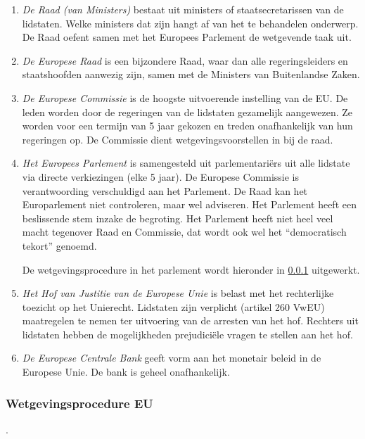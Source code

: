 \documentclass{article}
\begin{document}
\begin{enumerate}

  \item \emph{De Raad (van Ministers)} bestaat uit ministers of
    staatsecretarissen van de lidstaten. Welke ministers dat zijn hangt af van
    het te behandelen onderwerp. De Raad oefent samen met het Europees
    Parlement de wetgevende taak uit.

  \item \emph{De Europese Raad} is een bijzondere Raad, waar dan alle
    regeringsleiders en staatshoofden aanwezig zijn, samen met de Ministers van
    Buitenlandse Zaken.


  \item \emph{De Europese Commissie} is de hoogste uitvoerende instelling van
    de EU. De leden worden door de regeringen van de lidstaten gezamelijk
    aangewezen. Ze worden voor een termijn van 5 jaar gekozen en treden
    onafhankelijk van hun regeringen op. De Commissie dient
    wetgevingsvoorstellen in bij de raad.

  \item \emph{Het Europees Parlement} is samengesteld uit parlementari\"ers uit
    alle lidstate via directe verkiezingen (elke 5 jaar). De Europese Commissie
    is verantwoording verschuldigd aan het Parlement. De Raad kan het
    Europarlement niet controleren, maar wel adviseren. Het Parlement heeft een
    beslissende stem inzake de begroting. Het Parlement heeft niet heel veel
    macht tegenover Raad en Commissie, dat wordt ook wel het ``democratisch
    tekort'' genoemd.

    De wetgevingsprocedure in het parlement wordt hieronder in
    \ref{wetgevingeuropar} uitgewerkt.

  \item \emph{Het Hof van Justitie van de Europese Unie} is belast met het
    rechterlijke toezicht op het Unierecht. Lidstaten zijn verplicht (artikel
    260 VwEU) maatregelen te nemen ter uitvoering van de arresten van het hof.
    Rechters uit lidstaten hebben de mogelijkheden prejudici\"ele vragen te
    stellen aan het hof.

  \item \emph{De Europese Centrale Bank} geeft vorm aan het monetair beleid
    in de Europese Unie. De bank is geheel onafhankelijk.

\end{enumerate}

\subsubsection{Wetgevingsprocedure EU}
\label{wetgevingeuropar}.
\end{document}
